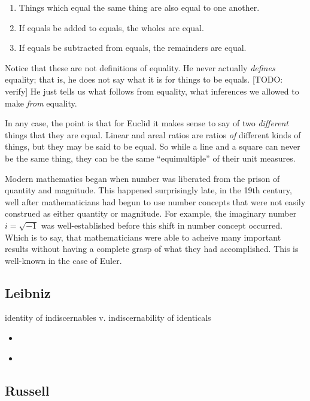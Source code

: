 \documentclass{article}
\begin{document}
\begin{enumerate}
\item Things which equal the same thing are also equal to one another.
\item If equals be added to equals, the wholes are equal.
\item If equals be subtracted from equals, the remainders are equal.
\end{enumerate}

Notice that these are not definitions of equality. He never actually
\textit{defines} equality; that is, he does not say what it is for
things to be equals. [TODO: verify] He just tells us what follows from
equality, what inferences we allowed to make \textit{from} equality.

In any case, the point is that for Euclid it makes sense to say of two
\textit{different} things that they are equal. Linear and areal ratios
are ratios \textit{of} different kinds of things, but they may be said
to be equal. So while a line and a square can never be the same thing,
they can be the same ``equimultiple'' of their unit measures.

Modern mathematics began when number was liberated from the prison of
quantity and magnitude. This happened surprisingly late, in the 19th
century, well after mathematicians had begun to use number concepts
that were not easily construed as either quantity or magnitude. For
example, the imaginary number \(i = \sqrt{-1}\) was well-established
before this shift in number concept occurred. Which is to say, that
mathematicians were able to acheive many important results without
having a complete grasp of what they had accomplished. This is
well-known in the case of Euler.

\subsection{Leibniz}

identity of indiscernables v. indiscernability of identicals

\begin{itemize}
\item {} \parencite{Abel2020LeibnizEI}
\item {} \parencite{10.2307/20016085}
\end{itemize}


\subsection{Russell}
\end{document}
